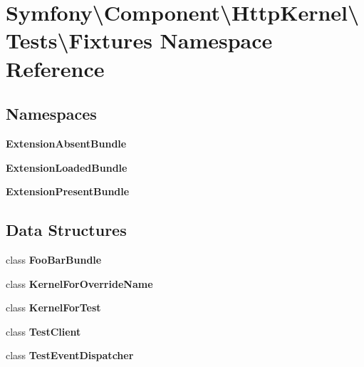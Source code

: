 \section{Symfony\textbackslash{}Component\textbackslash{}Http\+Kernel\textbackslash{}Tests\textbackslash{}Fixtures Namespace Reference}
\label{namespace_symfony_1_1_component_1_1_http_kernel_1_1_tests_1_1_fixtures}
\subsection*{Namespaces}
\begin{DoxyCompactItemize}
\item 
 {\bf Extension\+Absent\+Bundle}
\item 
 {\bf Extension\+Loaded\+Bundle}
\item 
 {\bf Extension\+Present\+Bundle}
\end{DoxyCompactItemize}
\subsection*{Data Structures}
\begin{DoxyCompactItemize}
\item 
class {\bf Foo\+Bar\+Bundle}
\item 
class {\bf Kernel\+For\+Override\+Name}
\item 
class {\bf Kernel\+For\+Test}
\item 
class {\bf Test\+Client}
\item 
class {\bf Test\+Event\+Dispatcher}
\end{DoxyCompactItemize}
